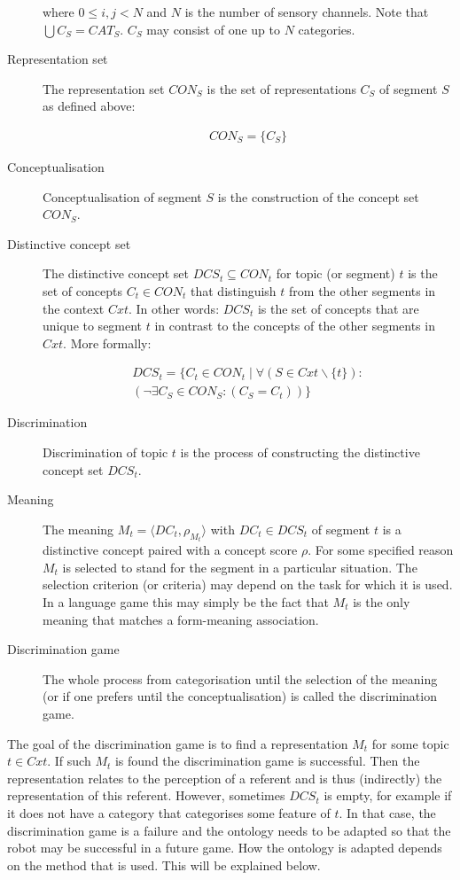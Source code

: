 \begin{description}
\n
where $0 \leq i,j < N$ and $N$ is the number of sensory channels. Note that $\bigcup C_S = CAT_S$. $C_S$ may consist of one up to $N$ categories.

\item[Representation set] The representation set $CON_S$ is the set of representations $C_S$ of segment $S$ as defined above: 

\begin{eqnarray}
CON_S = \{C_S\}
\end{eqnarray}

\item[Conceptualisation] Conceptualisation of segment $S$ is the construction of the concept set $CON_S$.

\item[Distinctive concept set] The distinctive concept set $DCS_t \subseteq CON_t$ for topic (or segment) $t$ is the set of concepts $C_t \in CON_t$ that distinguish $t$ from the other segments in the context $Cxt$. In other words: $DCS_t$ is the set of concepts that are unique to segment $t$ in contrast to the concepts of the other segments in $Cxt$. More formally:

\begin{eqnarray}
DCS_t = \{C_t \in CON_t \mid \forall (S \in Cxt \backslash \{t\}):\\ 
(\neg \exists C_S \in CON_S:(C_S=C_t))\}\nonumber
\end{eqnarray}

\item[Discrimination] Discrimination of topic $t$ is the process of constructing the distinctive concept set $DCS_t$.

\item[Meaning] The meaning $M_t = \langle DC_t,\rho_{M_t} \rangle$ with $DC_t \in DCS_t$ of segment $t$ is a distinctive concept paired with a concept score $\rho$. For some specified reason $M_t$ is selected to stand for the segment in a particular situation. The selection criterion (or criteria) may depend on the task for which it is used. In a language game this may simply be the fact that $M_t$ is the only meaning that matches a form-meaning association.

\item[Discrimination game] The whole process from categorisation until the selection of the meaning (or if one prefers until the conceptualisation) is called the discrimination game.
\end{description}

\n
The goal of the discrimination game is to find a representation $M_t$ for some topic $t\in Cxt$. If such $M_t$ is found the discrimination game is successful. Then the representation relates to the perception of a referent and is thus (indirectly) the representation of this referent. However, sometimes $DCS_t$ is empty, for example if it does not have a category that categorises some feature of $t$. In that case, the discrimination game is a failure and the ontology needs to be adapted so that the robot may be successful in a future game. How the ontology is adapted depends on the method that is used. This will be explained below.

